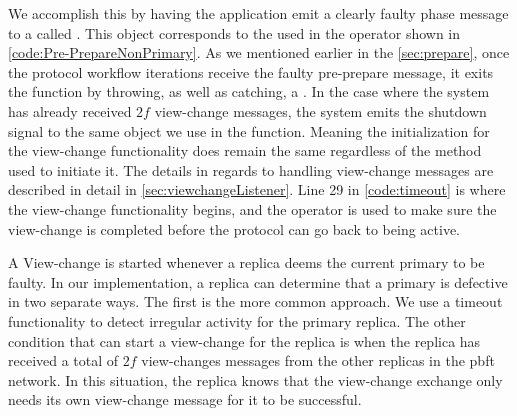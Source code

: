 We accomplish this by having the application emit a clearly faulty phase message to a  called . This  object corresponds to the  used in the  operator shown in \autoref{code:Pre-PrepareNonPrimary}. As we mentioned earlier in the \autoref{sec:prepare}, once the protocol workflow iterations receive the faulty pre-prepare message, it exits the function by throwing, as well as catching, a . In the case where the system has already received $2f$ view-change messages, the system emits the shutdown signal to the same   object we use in the   function. Meaning the initialization for the view-change functionality does remain the same regardless of the method used to initiate it. The details in regards to handling view-change messages are described in detail in  \autoref{sec:viewchangeListener}. Line 29 in \autoref{code:timeout} is where the view-change functionality begins, and the  operator is used to make sure the view-change is completed before the protocol can go back to being active. 

\iffalse
A View-change is started whenever a replica deems the current primary to be faulty. In our implementation, a replica can determine that a primary is defective in two separate ways. The first is the more common approach. We use a timeout functionality to detect irregular activity for the primary replica. The other condition that can start a view-change for the replica is when the replica has received a total of $2f$ view-changes messages from the other replicas in the \ac{pbft} network. In this situation, the replica knows that the view-change exchange only needs its own view-change message for it to be successful. 

